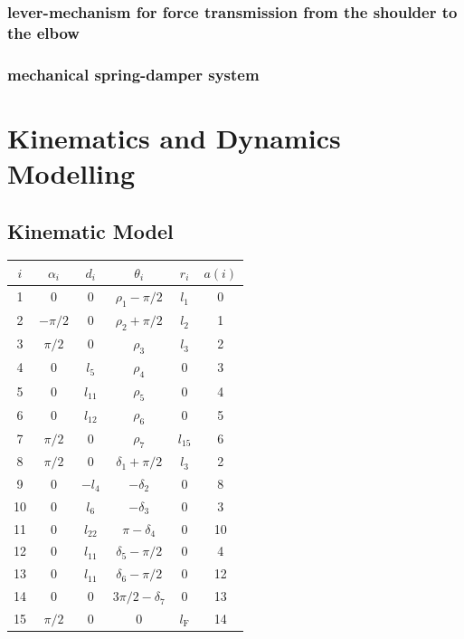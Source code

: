 \documentclass[letterpaper, 10 pt, conference]{ieeeconf}  %
\begin{document}
\subsubsection{lever-mechanism for force transmission from the shoulder to the elbow}

\subsubsection{mechanical spring-damper system}

\section{Kinematics and Dynamics Modelling}

\subsection{Kinematic Model}

\begin{tabular}[t]{|c||c|c|c|c|c|}
    \hline
    $i$ & $\alpha_i$ & $d_i$ & $\theta_i$ & $r_i$ & $a(i)$ \\
    \hline
    1 & $0$ & $0$ & $\rho_1-\pi/2$ & $l_1$ & 0 \\
    2 & $-\pi/2$ & $0$ & $\rho_2+\pi/2$ & $l_2$ & 1 \\
    3 & $\pi/2$ & $0$ & $\rho_3$ & $l_3$ & 2 \\
    4 & $0$ & $l_5$ & $\rho_4$ & $0$ & 3 \\
    5 & $0$ & $l_{11}$ & $\rho_5$ & $0$ & 4 \\
    6 & $0$ & $l_{12}$ & $\rho_6$ & $0$ & 5 \\
    7 & $\pi/2$ & $0$ & $\rho_7$ & $l_{15}$ & 6 \\
    8 & $\pi/2$ & $0$ & $\delta_{1}+\pi/2$ & $l_{3}$ & 2 \\
    9 & $0$ & $-l_{4}$ & $-\delta_{2}$ & $0$ & 8 \\
    10 & $0$ & $l_{6}$ & $-\delta_{3}$ & $0$ & 3 \\
    11 & $0$ & $l_{22}$ & $\pi-\delta_{4}$ & $0$ & 10 \\
    12 & $0$ & $l_{11}$ & $\delta_{5}-\pi/2$ & $0$ & 4 \\
    13 & $0$ & $l_{11}$ & $\delta_{6}-\pi/2$ & $0$ & 12 \\
    14 & $0$ & $0$ & $3\pi/2-\delta_{7}$ & $0$ & 13 \\
    15 & $\pi/2$ & $0$ & $0$ & $l_{\mathrm{F}}$ & 14 \\
    \hline
\end{tabular}
\end{document}

